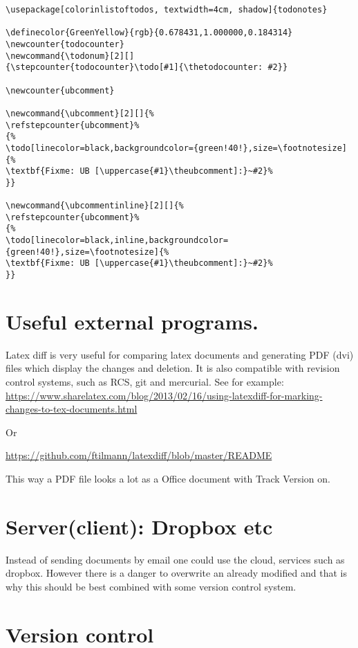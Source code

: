 \documentclass[11pt]{article}
\begin{document}
\begin{verbatim}
\usepackage[colorinlistoftodos, textwidth=4cm, shadow]{todonotes}

\definecolor{GreenYellow}{rgb}{0.678431,1.000000,0.184314}
\newcounter{todocounter}
\newcommand{\todonum}[2][]
{\stepcounter{todocounter}\todo[#1]{\thetodocounter: #2}}

\newcounter{ubcomment}

\newcommand{\ubcomment}[2][]{%
\refstepcounter{ubcomment}%
{%
\todo[linecolor=black,backgroundcolor={green!40!},size=\footnotesize]{%
\textbf{Fixme: UB [\uppercase{#1}\theubcomment]:}~#2}%
}}

\newcommand{\ubcommentinline}[2][]{%
\refstepcounter{ubcomment}%
{%
\todo[linecolor=black,inline,backgroundcolor={green!40!},size=\footnotesize]{%
\textbf{Fixme: UB [\uppercase{#1}\theubcomment]:}~#2}%
}}
\end{verbatim}


\section{Useful external programs.}
\label{sec:orgheadline3}

Latex diff is very useful for comparing latex documents and generating
PDF (dvi) files which  display the changes and deletion. It is also
compatible with revision control systems, such as RCS, git and
mercurial. See for example:
\url{https://www.sharelatex.com/blog/2013/02/16/using-latexdiff-for-marking-changes-to-tex-documents.html}

Or 

\url{https://github.com/ftilmann/latexdiff/blob/master/README}

This way a PDF file looks a lot as a Office document with Track
Version on.

\section{Server(client): Dropbox etc}
\label{sec:orgheadline4}

Instead of sending documents by email one could use the cloud,
services such as dropbox. However there is a danger to overwrite an
already modified and that is why this should be best combined with
some version control system.



\section{Version control}
\label{sec:orgheadline14}
\end{document}
